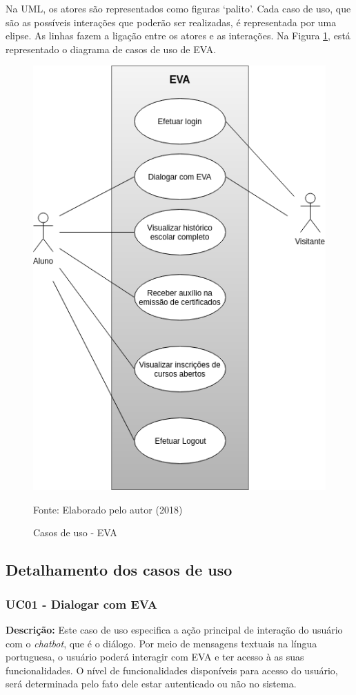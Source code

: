 Na UML, os atores são representados como figuras ‘palito’. Cada caso de uso, que são as possíveis interações que poderão ser realizadas, é representada por uma elipse. As linhas fazem a ligação entre os atores e as interações. Na Figura \ref{cap:03:fig:diagrama}, está representado o diagrama de casos de uso de EVA.
\begin{figure}
    \centering
    \includegraphics[width=0.3\linewidth]{src/imagens/CasoDeUsoEva.png}
    \caption{Casos de uso - EVA} Fonte: Elaborado pelo autor (2018)
    \label{cap:03:fig:diagrama}
\end{figure}

\subsection{Detalhamento dos casos de uso}

\subsubsection{UC01 - Dialogar com EVA}
\textbf{Descrição:} Este caso de uso especifica a ação principal de interação do usuário com o \textit{chatbot}, que é o diálogo. Por meio de mensagens textuais na língua portuguesa, o usuário poderá interagir com EVA e ter acesso à as suas funcionalidades. O nível de funcionalidades disponíveis para acesso do usuário, será determinada pelo fato dele estar autenticado ou não no sistema.


